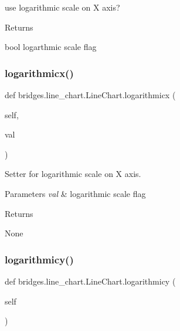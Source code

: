 use logarithmic scale on X axis? 

\begin{DoxyReturn}{Returns}


bool logarthmic scale flag 
\end{DoxyReturn}
\mbox{\label{classbridges_1_1line__chart_1_1_line_chart_a6feef7582874fb2338ff7fa7a469db5d}} 
\subsubsection{\texorpdfstring{logarithmicx()}{logarithmicx()}\hspace{0.1cm}{\footnotesize\ttfamily [2/2]}}
{\footnotesize\ttfamily def bridges.\+line\+\_\+chart.\+Line\+Chart.\+logarithmicx (\begin{DoxyParamCaption}\item[{}]{self,  }\item[{}]{val }\end{DoxyParamCaption})}



Setter for logarithmic scale on X axis. 


\begin{DoxyParams}{Parameters}
{\em val} & logarithmic scale flag \\
\hline
\end{DoxyParams}
\begin{DoxyReturn}{Returns}


None 
\end{DoxyReturn}
\mbox{\label{classbridges_1_1line__chart_1_1_line_chart_a7ddc26feab771e7b36e9040ee38fab7f}} 
\subsubsection{\texorpdfstring{logarithmicy()}{logarithmicy()}\hspace{0.1cm}{\footnotesize\ttfamily [1/2]}}
{\footnotesize\ttfamily def bridges.\+line\+\_\+chart.\+Line\+Chart.\+logarithmicy (\begin{DoxyParamCaption}\item[{}]{self }\end{DoxyParamCaption})}




